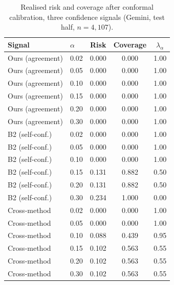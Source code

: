 \begin{table}[t]
\centering
\caption{Realised risk and coverage after conformal calibration, three confidence signals (Gemini, test half, $n=4{,}107$).}
\label{tab:risk-coverage}
\begin{tabular}{llccc}
\toprule
Signal & $\alpha$ & Risk & Coverage & $\lambda_\alpha$ \\
\midrule
Ours (agreement) & 0.02 & 0.000 & 0.000 & 1.00 \\
Ours (agreement) & 0.05 & 0.000 & 0.000 & 1.00 \\
Ours (agreement) & 0.10 & 0.000 & 0.000 & 1.00 \\
Ours (agreement) & 0.15 & 0.000 & 0.000 & 1.00 \\
Ours (agreement) & 0.20 & 0.000 & 0.000 & 1.00 \\
Ours (agreement) & 0.30 & 0.000 & 0.000 & 1.00 \\
\midrule
B2 (self-conf.) & 0.02 & 0.000 & 0.000 & 1.00 \\
B2 (self-conf.) & 0.05 & 0.000 & 0.000 & 1.00 \\
B2 (self-conf.) & 0.10 & 0.000 & 0.000 & 1.00 \\
B2 (self-conf.) & 0.15 & 0.131 & 0.882 & 0.50 \\
B2 (self-conf.) & 0.20 & 0.131 & 0.882 & 0.50 \\
B2 (self-conf.) & 0.30 & 0.234 & 1.000 & 0.00 \\
\midrule
Cross-method & 0.02 & 0.000 & 0.000 & 1.00 \\
Cross-method & 0.05 & 0.000 & 0.000 & 1.00 \\
Cross-method & 0.10 & 0.088 & 0.439 & 0.95 \\
Cross-method & 0.15 & 0.102 & 0.563 & 0.55 \\
Cross-method & 0.20 & 0.102 & 0.563 & 0.55 \\
Cross-method & 0.30 & 0.102 & 0.563 & 0.55 \\
\bottomrule
\end{tabular}
\end{table}
